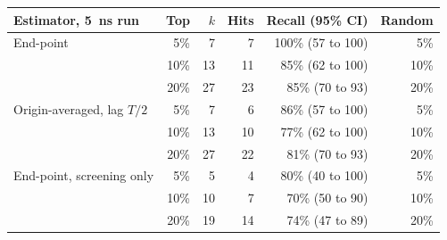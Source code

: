 \begin{tabular}{lrrrrr}
\toprule
Estimator, \SI{5}{\nano\second} run & Top & $k$ & Hits & Recall (95\% CI) & Random \\
\midrule
End-point & 5\% & 7 & 7 & 100\% (57 to 100) & 5\% \\
 & 10\% & 13 & 11 & 85\% (62 to 100) & 10\% \\
 & 20\% & 27 & 23 & 85\% (70 to 93) & 20\% \\
Origin-averaged, lag $T/2$ & 5\% & 7 & 6 & 86\% (57 to 100) & 5\% \\
 & 10\% & 13 & 10 & 77\% (62 to 100) & 10\% \\
 & 20\% & 27 & 22 & 81\% (70 to 93) & 20\% \\
End-point, screening only & 5\% & 5 & 4 & 80\% (40 to 100) & 5\% \\
 & 10\% & 10 & 7 & 70\% (50 to 90) & 10\% \\
 & 20\% & 19 & 14 & 74\% (47 to 89) & 20\% \\
\bottomrule
\end{tabular}
